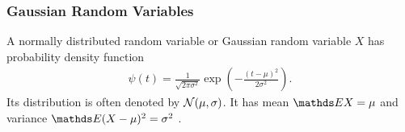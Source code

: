 \documentclass[a4paper, english, headtopline=0.08em, headsepline=0.04em, left = 1cm, right = 1cm, DIV=15]{article}
\begin{document}
\subsubsection*{Gaussian Random Variables}
A normally distributed random variable or Gaussian
random variable $X$ has probability density function
\begin{align*}
	\psi(t)=\frac{1}{\sqrt{2\pi\sigma^{2}}}\exp\left(-\frac{(t-\mu)^{2}}{2\sigma^{2}}\right).
\end{align*}
Its distribution is often denoted by $\mathcal{N}(\mu, \sigma)$.
It has mean $\EE X = \mu$ and variance $\EE (X - \mu)^2 = \sigma^2$ .
\end{document}
